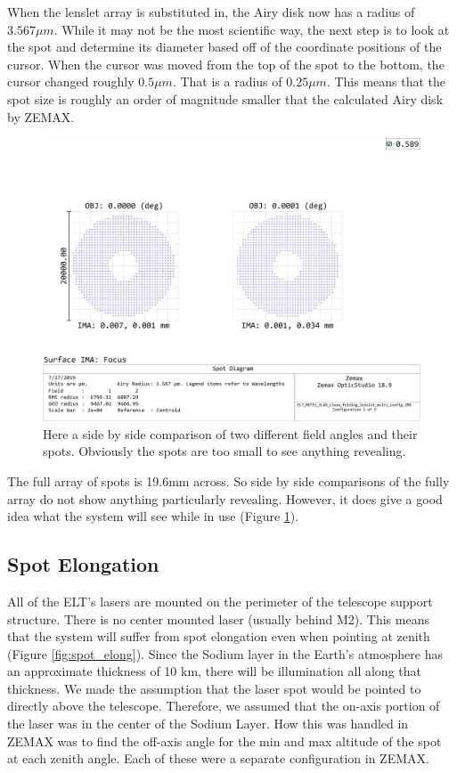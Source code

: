 When the lenslet array is substituted in, the Airy disk now has a radius of $3.567
\mu m$. While it may not be the most scientific way, the next step is to look at the
spot and determine its diameter based off of the coordinate positions of the cursor.
When the cursor was moved from the top of the spot to the bottom, the cursor changed
roughly $0.5 \mu m$.  That is a radius of $0.25 \mu m$.  This means that the spot
size is roughly an order of magnitude smaller that the calculated Airy disk by ZEMAX.

\begin{figure}[h!]
\centering
\includegraphics[width=14 cm]{Figures/Results/MLA_SpotDiagram.jpg}
\caption{Here a side by side comparison of two different field angles and their spots.  Obviously the spots are too small to see anything revealing.}
\label{fig:lenslet_spot_array}
\end{figure}

The full array of spots is 19.6mm across.  So side by side comparisons of the fully 
array do not show anything particularly revealing.  However, it does give a good
idea what the system will see while in use (Figure \ref{fig:lenslet_spot_array}).

\subsection{Spot Elongation}
\label{sec:spot_elong}

All of the ELT's lasers are mounted on the perimeter of the telescope support
structure.  There is no center mounted laser (usually behind M2).  This means that
the system will suffer from spot elongation even when pointing at zenith (Figure 
\ref{fig:spot_elong}).  Since the Sodium layer in the Earth's atmosphere has an
approximate thickness of 10 km, there will be illumination all along that thickness.
We made the assumption that the laser spot would be pointed to directly above the
telescope.  Therefore, we assumed that the on-axis portion of the laser was in the
center of the Sodium Layer. How this was handled in ZEMAX was to find the off-axis
angle for the min and max altitude of the spot at each zenith angle.  Each of these
were a separate configuration in ZEMAX.

